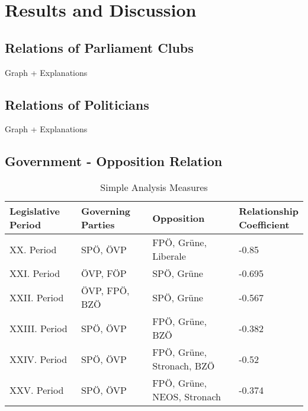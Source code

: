 \chapter{Results and Discussion}
\label{chap:evaluation}

\section{Relations of Parliament Clubs}
\label{sec:relations_clubs}
Graph + Explanations

\section{Relations of Politicians}
Graph + Explanations

\section{Government - Opposition Relation}


\begin{table}[h]

\bgroup
\def\arraystretch{1.2}
\begin{tabular}{| l | l | p{4cm} | l |}
\hline
  Legislative Period & Governing Parties & Opposition & \linebreakcell{Relationship\\Coefficient}  \\
\hline
\hline
  XX. Period & SPÖ, ÖVP & FPÖ, Grüne, Liberale & -0.85 \\
\hline
  XXI. Period & ÖVP, FÖP & SPÖ, Grüne & -0.695 \\
\hline
  XXII. Period & ÖVP, FPÖ, BZÖ & SPÖ, Grüne & -0.567 \\
\hline
  XXIII. Period & SPÖ, ÖVP & FPÖ, Grüne, BZÖ & -0.382 \\
\hline
  XXIV. Period & SPÖ, ÖVP & FPÖ, Grüne, Stronach, BZÖ & -0.52 \\
\hline
  XXV. Period & SPÖ, ÖVP & FPÖ, Grüne, NEOS, Stronach & -0.374 \\
\hline

\end{tabular}
\egroup
\caption{Simple Analysis Measures}
\label{table:simple_analysis}
\end{table}